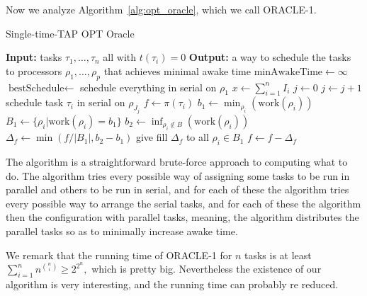 Now we analyze Algorithm~\ref{alg:opt_oracle}, which we call
ORACLE-1. 

\begin{algorithm}
  \caption{Single-time-TAP OPT Oracle}
  \label{alg:opt_oracle}
  \begin{algorithmic}
    \State \textbf{Input:} tasks $\tau_1,\ldots, \tau_n$ all with $t(\tau_i) = 0$
    \State \textbf{Output:} a way to schedule the tasks to
    processors $\rho_1, \ldots, \rho_p$ that achieves minimal awake time
    \State 
    \State $\text{minAwakeTime} \gets \infty$
    \State $\text{bestSchedule} \gets $ schedule everything in serial on $\rho_1$
      \State $x \gets \sum_{i=1}^n I_i$
        \State $j \gets 0$
            \State $j \gets j+1$
            \State schedule task $\tau_i$ in serial on $\rho_{J_j}$
          \EndIf
        \EndFor
            \State $f \gets \pi(\tau_i)$
              \State $b_1\gets \min_{\rho_i}(\text{work}(\rho_i))$
              \State $B_1 \gets \{\rho_i | \text{work}(\rho_i)=b_1\}$
              \State $b_2\gets \inf_{\rho_i\not\in B}(\text{work}(\rho_i))$
              \State $\Delta_f \gets \min(f/|B_1|, b_2-b_1)$
              \State give fill $\Delta_f$ to all $\rho_i \in B_1$
              \State $f \gets f - \Delta_f$
            \EndWhile
          \EndIf
        \EndFor
        \EndIf
      \EndFor
    \EndFor
  \end{algorithmic}
\end{algorithm}

The algorithm is a straightforward brute-force approach to
computing what to do. The algorithm tries every possible way of
assigning some tasks to be run in parallel and others to be run
in serial, and for each of these the algorithm tries every
possible way to arrange the serial tasks, and for each of these
the algorithm then  the configuration with parallel
tasks, meaning, the algorithm distributes the parallel tasks so
as to minimally increase awake time.

We remark that the running time of ORACLE-1 for $n$ tasks is at
least $\sum_{i=1}^n n^{\binom{n}{i}} \ge 2^{2^n},$ which is
pretty big. Nevertheless the existence of our algorithm is very
interesting, and the running time can probably re reduced.

